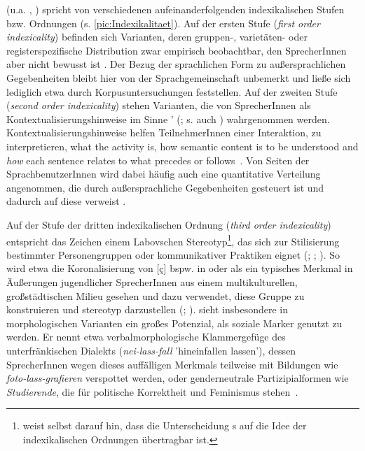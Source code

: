 \citeauthor{Silverstein1979} (u.a. \citeyear{Silverstein1979}, \citeyear{Silverstein2003}) spricht von verschiedenen aufeinanderfolgenden indexikalischen Stufen bzw. Ordnungen (s. \autoref{pic:Indexikalitaet}). 
Auf der ersten Stufe (\textit{first order indexicality}) befinden sich Varianten, deren gruppen-, varietäten- oder registerspezifische Distribution zwar empirisch beobachtbar, den SprecherInnen aber nicht bewusst ist \citep[s.][265]{Spitzmuller2013}.
Der Bezug der sprachlichen Form zu außersprachlichen Gegebenheiten bleibt hier von der Sprachgemeinschaft unbemerkt und ließe sich lediglich etwa durch Korpusuntersuchungen feststellen.
Auf der zweiten Stufe (\textit{second order indexicality}) stehen Varianten, die von SprecherInnen als Kontextualisierungshinweise im Sinne \citeauthor{Gumperz.1982}' (\citeyear{Gumperz.1982}; s. auch \citealp{Auer.1986}) wahrgenommen werden. 
Kontextualisierungshinweise helfen TeilnehmerInnen einer Interaktion, zu interpretieren, {\glqq}what the activity is, how semantic content is to be understood and \textit{how }each sentence relates to what precedes or follows{\grqq}~\citep[131, Hervorhebung im Original]{Gumperz.1982}. 
Von Seiten der SprachbenutzerInnen wird dabei häufig auch eine quantitative Verteilung angenommen, die durch außersprachliche Gegebenheiten gesteuert ist und dadurch auf diese verweist \citep[s.][266]{Spitzmuller2013}. 

Auf der Stufe der dritten indexikalischen Ordnung (\textit{third order indexicality}) entspricht das Zeichen einem Labovschen Stereotyp\footnote{\citet[52]{Silverstein.2016} weist selbst darauf hin, dass die Unterscheidung \citeauthor{Labov1963}s auf die Idee der indexikalischen Ordnungen übertragbar ist.}, das sich zur Stilisierung bestimmter Personengruppen oder kommunikativer Praktiken eignet (\citealp[s.][308--309]{Labov1978}; \citealp[220]{Silverstein2003}; \citealp[92]{Eckert2012}). 
So wird etwa die Koronalisierung von [ç] bspw. in  oder  als ein typisches Merkmal in Äußerungen jugendlicher SprecherInnen aus einem multikulturellen, großstädtischen Milieu gesehen und dazu verwendet, diese Gruppe zu konstruieren und stereotyp darzustellen (\citealp[s.][]{Androutsopoulos.2011}; \citealp[11]{Auer2014}). 
\citet[523]{Harnisch.2005} sieht insbesondere in morphologischen Varianten ein großes Potenzial, als soziale Marker genutzt zu werden. 
Er nennt etwa verbalmorphologische Klammergef{\"u}ge des unterfr{\"a}nkischen Dialekts (\textit{nei-lass-fall }'hineinfallen lassen'), dessen SprecherInnen wegen dieses auff{\"a}lligen Merkmals teilweise mit Bildungen wie \textit{foto-lass-grafieren }verspottet werden, oder genderneutrale Partizipialformen wie \textit{Studierende}, die f{\"u}r politische Korrektheit und Feminismus stehen~\citep[s.][524]{Harnisch.2005}.

